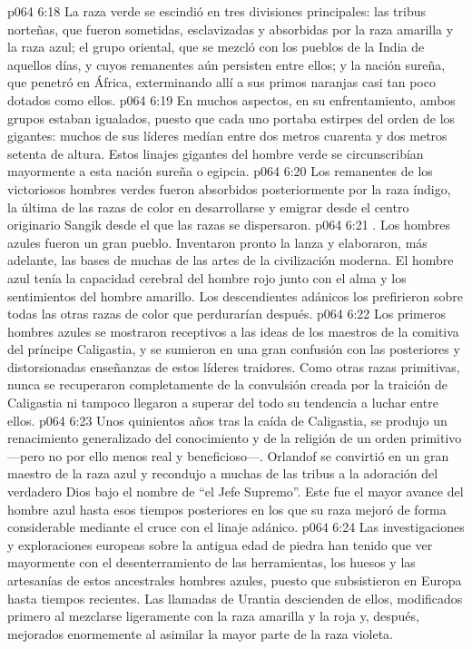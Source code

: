 \vs p064 6:18 La raza verde se escindió en tres divisiones principales: las tribus norteñas, que fueron sometidas, esclavizadas y absorbidas por la raza amarilla y la raza azul; el grupo oriental, que se mezcló con los pueblos de la India de aquellos días, y cuyos remanentes aún persisten entre ellos; y la nación sureña, que penetró en África, exterminando allí a sus primos naranjas casi tan poco dotados como ellos.
\vs p064 6:19 En muchos aspectos, en su enfrentamiento, ambos grupos estaban igualados, puesto que cada uno portaba estirpes del orden de los gigantes: muchos de sus líderes medían entre dos metros cuarenta y dos metros setenta de altura. Estos linajes gigantes del hombre verde se circunscribían mayormente a esta nación sureña o egipcia.
\vs p064 6:20 Los remanentes de los victoriosos hombres verdes fueron absorbidos posteriormente por la raza índigo, la última de las razas de color en desarrollarse y emigrar desde el centro originario Sangik desde el que las razas se dispersaron.
\vs p064 6:21 . Los hombres azules fueron un gran pueblo. Inventaron pronto la lanza y elaboraron, más adelante, las bases de muchas de las artes de la civilización moderna. El hombre azul tenía la capacidad cerebral del hombre rojo junto con el alma y los sentimientos del hombre amarillo. Los descendientes adánicos los prefirieron sobre todas las otras razas de color que perdurarían después.
\vs p064 6:22 Los primeros hombres azules se mostraron receptivos a las ideas de los maestros de la comitiva del príncipe Caligastia, y se sumieron en una gran confusión con las posteriores y distorsionadas enseñanzas de estos líderes traidores. Como otras razas primitivas, nunca se recuperaron completamente de la convulsión creada por la traición de Caligastia ni tampoco llegaron a superar del todo su tendencia a luchar entre ellos.
\vs p064 6:23 Unos quinientos años tras la caída de Caligastia, se produjo un renacimiento generalizado del conocimiento y de la religión de un orden primitivo ---pero no por ello menos real y beneficioso---. Orlandof se convirtió en un gran maestro de la raza azul y recondujo a muchas de las tribus a la adoración del verdadero Dios bajo el nombre de “el Jefe Supremo”. Este fue el mayor avance del hombre azul hasta esos tiempos posteriores en los que su raza mejoró de forma considerable mediante el cruce con el linaje adánico.
\vs p064 6:24 Las investigaciones y exploraciones europeas sobre la antigua edad de piedra han tenido que ver mayormente con el desenterramiento de las herramientas, los huesos y las artesanías de estos ancestrales hombres azules, puesto que subsistieron en Europa hasta tiempos recientes. Las llamadas  de Urantia descienden de ellos, modificados primero al mezclarse ligeramente con la raza amarilla y la roja y, después, mejorados enormemente al asimilar la mayor parte de la raza violeta.
